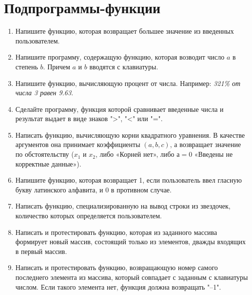 \section{Подпрограммы-функции}
\begin{enumerate}[leftmargin=*]
    \item Напишите функцию, которая возвращает большее значение из введенных пользователем.
    \item Напишите программу, содержащую функцию, которая возводит число $a$ в степень $b$. Причем $a$ и $b$ вводятся с клавиатуры.
    \item Напишите функцию, вычисляющую процент от числа. Например: \textit{321\% от числа 3 равен 9.63}.
    \item Сделайте программу, функция которой сравнивает введенные числа и результат выдает в виде знаков ">", "<" или "=".
    \item Написать функцию, вычисляющую корни квадратного уравнения. В качестве аргументов она принимает коэффициенты $(a, b, c)$, а возвращает значение по обстоятельству ($x_1$ и $x_2$, либо «Корней нет», либо $а=0$ «Введены не корректные данные»).
    \item Напишите функцию, которая возвращает 1, если пользователь ввел гласную букву латинского алфавита, и 0 в противном случае.
    \item Написать функцию, специализированную на вывод строки из звездочек, количество которых определяется пользователем.
    \item Написать и протестировать функцию, которая из заданного массива формирует новый массив, состоящий только из элементов, дважды входящих в первый массив.
    \item Написать и протестировать функцию, возвращающую номер самого последнего элемента из массива, который совпадает с заданным с клавиатуры числом. Если такого элемента нет, функция должна возвращать "–1".
\end{enumerate}
